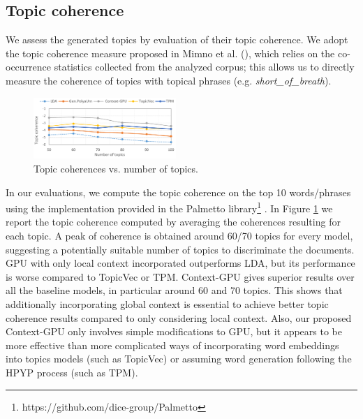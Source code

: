 \documentclass[letterpaper]{article}
\begin{document}
\subsection{Topic coherence}
We assess the generated topics by evaluation of their topic coherence. %
We adopt the topic coherence measure proposed in Mimno et al. (\citeyear{Mimno11}), which relies on the co-occurrence statistics collected from the analyzed corpus; this allows us to directly measure the coherence of topics with topical phrases (e.g. \textit{short\_of\_breath}).

\begin{figure}[!ht]
\centering
\includegraphics[width=0.48\textwidth]{model_coherences_croped.pdf}
\caption{Topic coherences vs. number of topics.}
\label{fig:coherences}
\end{figure}

In our evaluations, we compute the topic coherence on the top 10 words/phrases using the implementation provided in the Palmetto library\footnote{https://github.com/dice-group/Palmetto} \cite{Roder15}.
In Figure \ref{fig:coherences} we report the topic coherence computed by averaging the coherences resulting for each topic. %
A peak of coherence is obtained around 60/70 topics for every model, suggesting a potentially suitable number of topics to discriminate the documents. GPU with only local context incorporated outperforms LDA, but its performance is worse compared to TopicVec or TPM.
Context-GPU gives superior results over all the baseline models, in particular around 60 and 70 topics. This shows that additionally incorporating global context is essential to achieve better topic coherence results compared to only considering local context. Also, our proposed Context-GPU only involves simple modifications to GPU, but it appears to be more effective than more complicated ways of incorporating word embeddings into topics models (such as TopicVec) or assuming word generation following the HPYP process (such as TPM).
\end{document}
